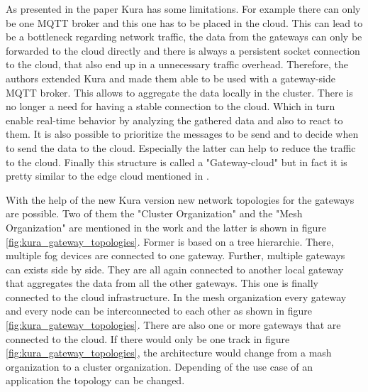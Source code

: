 As presented in the paper Kura has some limitations.
For example there can only be one \ac{MQTT} broker and this one has to be placed in the cloud.\autocite[cf.][p. 3]{Bellavista:2017}
This can lead to be a bottleneck regarding network traffic, the data from the gateways can only be forwarded to the cloud directly and there is always a persistent socket connection to the cloud, that also end up in a unnecessary traffic overhead.\autocite[cf.][p. 3]{Bellavista:2017}
Therefore, the authors extended Kura and made them able to be used with a gateway-side \ac{MQTT} broker.
This allows to aggregate the data locally in the cluster.\autocite[cf.][p. 3]{Bellavista:2017}
There is no longer a need for having a stable connection to the cloud.
Which in turn enable real-time behavior by analyzing the gathered data and also to react to them.\autocite[cf.][p. 3]{Bellavista:2017}
It is also possible to prioritize the messages to be send and to decide when to send the data to the cloud.\autocite[cf.][p. 3]{Bellavista:2017}
Especially the latter can help to reduce the traffic to the cloud.
Finally this structure is called a "Gateway-cloud" but in fact it is pretty similar to the edge cloud mentioned in \autocite{Pahl:2016}.

With the help of the new Kura version new network topologies for the gateways are possible.
Two of them the "Cluster Organization" and the "Mesh Organization" are mentioned in the work and the latter is shown in figure \ref{fig:kura_gateway_topologies}.\autocite[cf.][p. 4]{Bellavista:2017}
Former is based on a tree hierarchie.
There, multiple fog devices are connected to one gateway.
Further, multiple gateways can exists side by side.
They are all again connected to another local gateway that aggregates the data from all the other gateways.
This one is finally connected to the cloud infrastructure.
In the mesh organization every gateway and every node can be interconnected to each other as shown in figure \ref{fig:kura_gateway_topologies}.
There are also one or more gateways that are connected to the cloud.
If there would only be one track in figure \ref{fig:kura_gateway_topologies}, the architecture would change from a mash organization to a cluster organization.
Depending of the use case of an application the topology can be changed.

